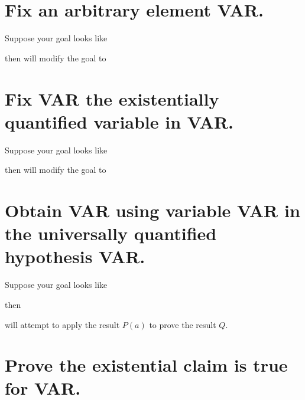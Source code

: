 


\section{Fix an arbitrary element VAR.}

Suppose your goal looks like

then 
will modify the goal to


\section{Fix VAR the existentially quantified variable in VAR.}
Suppose your goal looks like

then 
will modify the goal to



\section{Obtain VAR using variable VAR in the universally quantified hypothesis VAR.}
Suppose your goal looks like

then 


will attempt to apply the result $P(a)$ to prove the result $Q$.

\section{Prove the existential claim is true for VAR.}

